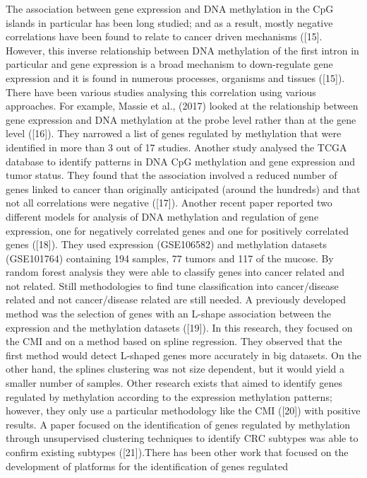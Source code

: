 \documentclass[10pt,letterpaper]{article}
\begin{document}
The association between gene expression and DNA methylation in the CpG
islands in particular has been long studied; and as a result, mostly
negative correlations have been found to relate to cancer driven
mechanisms ({[}15{]}. However, this inverse relationship between DNA
methylation of the first intron in particular and gene expression is a
broad mechanism to down-regulate gene expression and it is found in
numerous processes, organisms and tissues ({[}15{]}). There have been
various studies analysing this correlation using various approaches. For
example, Massie et al., (2017) looked at the relationship between gene
expression and DNA methylation at the probe level rather than at the
gene level ({[}16{]}). They narrowed a list of genes regulated by methylation 
that were identified in more than 3 out of 17 studies. Another study analysed
the TCGA database to identify patterns in DNA CpG methylation and gene
expression and tumor status. They found that the association involved a
reduced number of genes linked to cancer than originally anticipated
(around the hundreds) and that not all correlations were negative
({[}17{]}). Another recent paper reported two different models for
analysis of DNA methylation and regulation of gene expression, one for
negatively correlated genes and one for positively correlated genes
({[}18{]}). They used expression (GSE106582) and methylation
datasets (GSE101764) containing 194 samples, 77 tumors and 117 of the
mucose. By random forest analysis they were able to classify genes into
cancer related and not related. Still methodologies to find tune
classification into cancer/disease related and not cancer/disease
related are still needed. A previously developed method was the
selection of genes with an L-shape association between the expression
and the methylation datasets ({[}19{]}). In this
research, they focused on the CMI and on a method based on spline
regression. They observed that the first method would detect L-shaped
genes more accurately in big datasets. On the other hand, the splines
clustering was not size dependent, but it would yield a smaller number
of samples. Other research exists that aimed to identify genes regulated
by methylation according to the expression methylation patterns;
however, they only use a particular methodology like the CMI
({[}20{]}) with positive results. A paper focused on the
identification of genes regulated by methylation through unsupervised
clustering techniques to identify CRC subtypes was able to confirm
existing subtypes ({[}21{]}).There has been other work that focused on
the development of platforms for the identification of genes regulated
\end{document}
